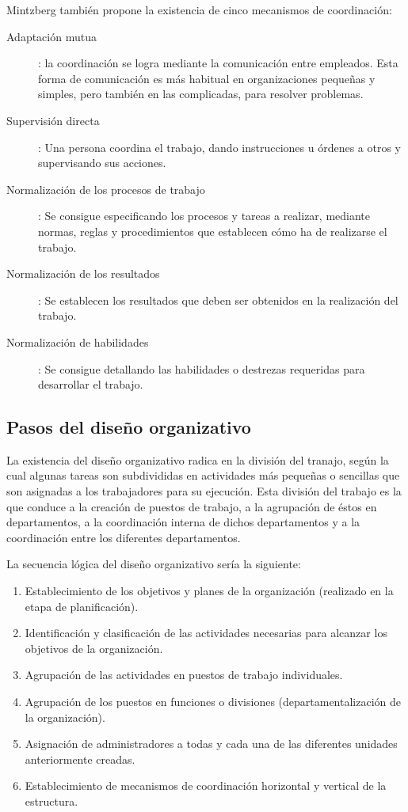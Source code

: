 \documentclass[12pt,a4paper,spanish]{report}
\begin{document}
			Mintzberg también propone la existencia de cinco mecanismos de coordinación:
			\begin{description}
				\item[Adaptación mutua]: la coordinación se logra mediante la comunicación entre empleados. Esta forma de comunicación es más habitual en organizaciones pequeñas y simples, pero también en las complicadas, para resolver problemas.

				\item[Supervisión directa]: Una persona coordina el trabajo, dando instrucciones u órdenes a otros y supervisando sus acciones.

				\item[Normalización de los procesos de trabajo]: Se consigue especificando los procesos y tareas a realizar, mediante normas, reglas y procedimientos que establecen cómo ha de realizarse el trabajo.

				\item[Normalización de los resultados]: Se establecen los resultados que deben ser obtenidos en la realización del trabajo.

				\item[Normalización de habilidades]: Se consigue detallando las habilidades o destrezas requeridas para desarrollar el trabajo.
			\end{description}

		\subsection{\textcolor[rgb]{0.5,0.1,0.4}Pasos del diseño organizativo}
			La existencia del diseño organizativo radica en la división del tranajo, según la cual algunas tareas son subdivididas en actividades más pequeñas o sencillas que son asignadas a los trabajadores para su ejecución. Esta división del trabajo es la que conduce a la creación de puestos de trabajo, a la agrupación de éstos en departamentos, a la coordinación interna de dichos departamentos y a la coordinación entre los diferentes departamentos. 

			La secuencia lógica del diseño organizativo sería la siguiente:
			\begin{enumerate}[1.]
				\item Establecimiento de los objetivos y planes de la organización (realizado en la etapa de planificación).
				\item Identificación y clasificación de las actividades necesarias para alcanzar los objetivos de la organización.
				\item Agrupación de las actividades en puestos de trabajo individuales.
				\item Agrupación de los puestos en funciones o divisiones (departamentalización de la organización).
				\item Asignación de administradores a todas y cada una de las diferentes unidades anteriormente creadas.
				\item Establecimiento de mecanismos de coordinación horizontal y vertical de la estructura.
			\end{enumerate}
\end{document}

